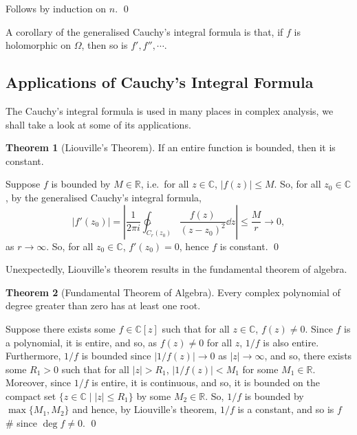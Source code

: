 \documentclass[
]{article}
\theoremstyle{definition}
\newtheorem{theorem}{Theorem}
\theoremstyle{definition}
\begin{document}
Follows by induction on \(n\). \qed

A corollary of the generalised Cauchy's integral formula is that, if
\(f\) is holomorphic on \(\Omega\), then so is \(f', f'', \cdots\).

\hypertarget{applications-of-cauchys-integral-formula}{%
\subsection{Applications of Cauchy's Integral
Formula}\label{applications-of-cauchys-integral-formula}}

The Cauchy's integral formula is used in many places in complex
analysis, we shall take a look at some of its applications.

\begin{theorem}[Liouville's Theorem]
  If an entire function is bounded, then it is constant.
\end{theorem}
\proof

Suppose \(f\) is bounded by \(M \in \mathbb{R}\), i.e.~for all
\(z \in \mathbb{C}\), \(|f(z)| \le M\). So, for all
\(z_0 \in \mathbb{C}\), by the generalised Cauchy's integral formula,
\[|f'(z_0)| = \left|\frac{1}{2\pi i} \ointctrclockwise_{C_r(z_0)} 
    \frac{f(z)}{(z - z_0)^2} \dd z\right|
    \le \frac{M}{r} \to 0,\] as \(r \to \infty\). So, for all
\(z_0 \in \mathbb{C}\), \(f'(z_0) = 0\), hence \(f\) is constant. \qed

Unexpectedly, Liouville's theorem results in the fundamental theorem of
algebra.

\begin{theorem}[Fundamental Theorem of Algebra]
  Every complex polynomial of degree greater than zero has at least one root.
\end{theorem}
\proof

Suppose there exists some \(f \in \mathbb{C}[z]\) such that for all
\(z \in \mathbb{C}\), \(f(z) \neq 0\). Since \(f\) is a polynomial, it
is entire, and so, as \(f(z) \neq 0\) for all \(z\), \(1 / f\) is also
entire. Furthermore, \(1 / f\) is bounded since \(|1 / f(z)| \to 0\) as
\(|z| \to \infty\), and so, there exists some \(R_1 > 0\) such that for
all \(|z| > R_1\), \(|1 / f(z)| < M_1\) for some \(M_1 \in \mathbb{R}\).
Moreover, since \(1 / f\) is entire, it is continuous, and so, it is
bounded on the compact set \(\{z \in \mathbb{C} \mid |z| \le R_1\}\) by
some \(M_2 \in \mathbb{R}\). So, \(1 / f\) is bounded by
\(\max\{M_1, M_2\}\) and hence, by Liouville's theorem, \(1 / f\) is a
constant, and so is \(f\) \# since \(\deg f \neq 0\). \qed
\end{document}
